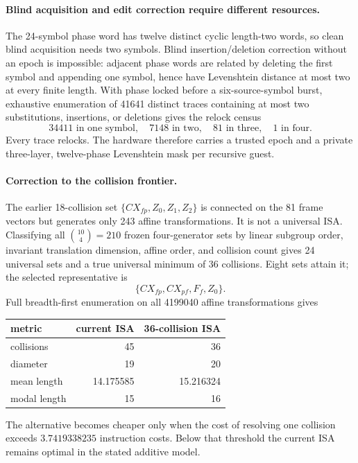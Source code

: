 \paragraph{Blind acquisition and edit correction require different resources.}
The 24-symbol phase word has twelve distinct cyclic length-two words, so clean blind
acquisition needs two symbols.  Blind insertion/deletion correction without an epoch is
impossible: adjacent phase words are related by deleting the first symbol and appending
one symbol, hence have Levenshtein distance at most two at every finite length.  With phase
locked before a six-source-symbol burst, exhaustive enumeration of 41641 distinct traces
containing at most two substitutions, insertions, or deletions gives the relock census
\[
 34411\text{ in one symbol},\quad
 7148\text{ in two},\quad
 81\text{ in three},\quad
 1\text{ in four}.
\]
Every trace relocks.  The hardware therefore carries a trusted epoch and a private
three-layer, twelve-phase Levenshtein mask per recursive guest.

\paragraph{Correction to the collision frontier.}
The earlier 18-collision set
$\{CX_{fp},Z_0,Z_1,Z_2\}$ is connected on the 81 frame vectors but generates only 243
affine transformations.  It is not a universal ISA.  Classifying all
$\binom{10}{4}=210$ frozen four-generator sets by linear subgroup order, invariant
translation dimension, affine order, and collision count gives 24 universal sets and a
true universal minimum of 36 collisions.  Eight sets attain it; the selected representative
is
\[
 \{CX_{fp},CX_{pf},F_f,Z_0\}.
\]
Full breadth-first enumeration on all 4199040 affine transformations gives
\begin{center}
\begin{tabular}{lrr}
\hline
metric & current ISA & 36-collision ISA\\
\hline
collisions & 45 & 36\\
diameter & 19 & 20\\
mean length & 14.175585 & 15.216324\\
modal length & 15 & 16\\
\hline
\end{tabular}
\end{center}
The alternative becomes cheaper only when the cost of resolving one collision exceeds
$3.7419338235$ instruction costs.  Below that threshold the current ISA remains optimal in
the stated additive model.

